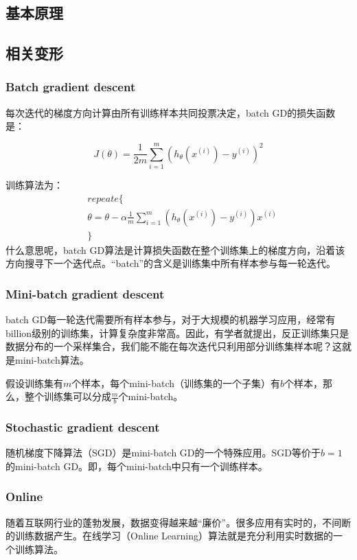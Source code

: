 \documentclass[a4paper,10pt]{ctexbook}
\begin{document}
\subsection{基本原理}

\subsection{相关变形}

\subsubsection{Batch gradient descent}
每次迭代的梯度方向计算由所有训练样本共同投票决定，batch GD的损失函数是：

\[
    J(\theta)=\frac{1}{2m}{\sum_{i=1}^{m}{(h_{\theta}(x^{(i)}) - y^{(i)})^2}}
\]

训练算法为：
\begin{align*}
    & repeate \{ \\
    &    \theta = \theta - \alpha \frac{1}{m}{\sum_{i=1}^{m}{(h_{\theta}(x^{(i)}) - y^{(i)})x^{(i)}}} \\
    & \}
\end{align*}
什么意思呢，batch GD算法是计算损失函数在整个训练集上的梯度方向，沿着该方向搜寻下一个迭代点。``batch''的含义是训练集中所有样本参与每一轮迭代。


\subsubsection{Mini-batch gradient descent}
batch GD每一轮迭代需要所有样本参与，对于大规模的机器学习应用，经常有billion级别的训练集，计算复杂度非常高。因此，有学者就提出，反正训练集只是数据分布的一个采样集合，我们能不能在每次迭代只利用部分训练集样本呢？这就是mini-batch算法。

假设训练集有$m$个样本，每个mini-batch（训练集的一个子集）有$b$个样本，那么，整个训练集可以分成$\frac{m}{b}$个mini-batch。


\subsubsection{Stochastic gradient descent}
随机梯度下降算法（SGD）是mini-batch GD的一个特殊应用。SGD等价于$b=1$的mini-batch GD。即，每个mini-batch中只有一个训练样本。

\subsubsection{Online}
随着互联网行业的蓬勃发展，数据变得越来越``廉价''。很多应用有实时的，不间断的训练数据产生。在线学习（Online Learning）算法就是充分利用实时数据的一个训练算法。
\end{document}
